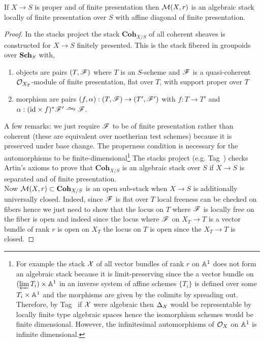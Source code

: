\documentclass[12pt]{article}
\begin{document}
\begin{theorem}
If $X \to S$ is proper and of finite presentation then $\mathcal{M}(X, r)$ is an algebraic stack locally of finite presentation over $S$ with affine diagonal of finite presentation.
\end{theorem}

\renewcommand{\Coh}{\mathbf{Coh}}

\begin{proof}
In the stacks project the stack $\Coh_{X/S}$ of all coherent sheaves is constructed for $X \to S$ finitely presented. This is the stack fibered in groupoids over $\mathbf{Sch}_S$ with,
\begin{enumerate}
\item objects are pairs $(T, \mathscr{F})$ where $T$ is an $S$-scheme and $\mathscr{F}$ is a quasi-coherent $\mathcal{O}_{X_T}$-module of finite presentation, flat over $T$, with support proper over $T$
\item morphism are pairs $(f, \alpha) : (T, \mathscr{F}) \to (T', \mathscr{F}')$ with $f : T \to T'$ and $\alpha : (\id \times f)^* \F' \iso \F$.
\end{enumerate}
A few remarks: we just require $\mathscr{F}$ to be of finite presentation rather than coherent (these are equivalent over noetherian test schemes) because it is preserved under base change. The properness condition is necessary for the automorphisms to be finite-dimensional\footnote{For example the stack $\mathcal{X}$ of all vector bundles of rank $r$ on $\mathbb{A}^1$ does not form an algebraic stack because it is limit-preserving since the a vector bundle on $(\operatorname*{\varprojlim} T_i) \times \mathbb{A}^1$ in an inverse system of affine schemes $\{ T_i \}$ is defined over some $T_i \times \mathbb{A}^1$ and the morphisms are given by the colimits by spreading out. Therefore, by Tag~ if $\mathcal{X}$ were algebraic then $\Delta_{\mathcal{X}}$ would be representable by locally finite type algebraic spaces hence the isomorphism schemes would be finite dimensional. However, the infinitesimal automorphisms of $\mathcal{O}_{X}$ on $\mathbb{A}^1$ is infinite dimensional.}
The stacks project (e.g. Tag~) checks Artin's axioms to prove that $\Coh_{X/S}$ is an algebraic stack over $S$ if $X \to S$ is separated and of finite presentation.
\bigskip\\
Now $\M(X, r) \subset \Coh_{X/S}$ is an open sub-stack when $X \to S$ is additionally universally closed. Indeed, since $\mathscr{F}$ is flat over $T$ local freeness can be checked on fibers hence we just need to show that the locus on $T$ where $\mathscr{F}$ is locally free on the fiber is open and indeed since the locus where $\mathscr{F}$ on $X_T \to T$ is a vector bundle of rank $r$ is open on $X_T$ the locus on $T$ is open since the $X_T \to T$ is closed.

\end{proof}
\end{document}
